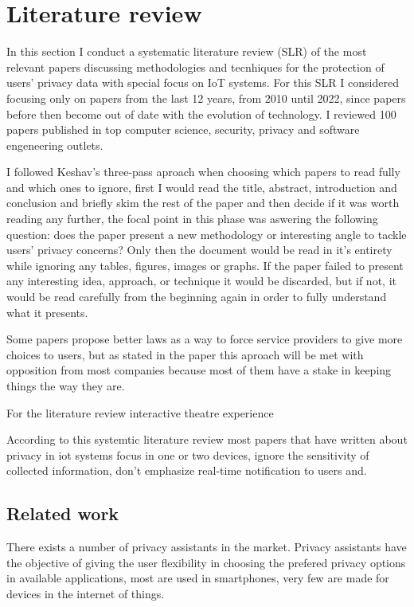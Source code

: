 \documentclass[conference]{IEEEtran}
\begin{document}
\section{Literature review}

In this section I conduct a systematic literature review (SLR) of the most relevant papers
discussing methodologies and tecnhiques for the protection of users' privacy data
with special focus on IoT systems. For this SLR I considered focusing only
on papers from the last 12 years, from 2010 until 2022, since papers before then
become out of date with the evolution of technology. I reviewed 100 papers published
in top computer science, security, privacy and software engeneering outlets.

I followed Keshav's three-pass aproach \cite{KeshavHow} when choosing which
papers to read fully and which ones to ignore, first I would read the title, abstract,
introduction and conclusion and briefly skim the rest of the paper and then
decide if it was worth reading any further, the focal point in this phase was
aswering the following question: does the paper present a new methodology or
interesting angle to tackle users' privacy concerns? Only then the document would
be read in it's entirety while ignoring any tables, figures, images or graphs.
If the paper failed to present any interesting idea, approach, or
technique it would be discarded, but if not, it would be read carefully from
the beginning again in order to fully understand what it presents.

Some papers propose better laws \cite{} as a way to force service providers
to give more choices to users, but as stated in the paper this
aproach will be met with opposition from most companies because
most of them have a stake in keeping things the way they are.

For the literature review interactive theatre experience \cite{SkirpanPrivacy}

According to this systemtic literature review \cite{Gupta2022Privacy} most papers
that have written about privacy in iot systems focus in one or two devices,
ignore the sensitivity of collected information, don't emphasize real-time
notification to users and.

\subsection{Related work}

There exists a number of privacy assistants in the market. Privacy assistants
have the objective of giving the user flexibility in choosing the
prefered privacy options in available applications, most are used in
smartphones, very few are made for devices in the internet of things.
\end{document}
